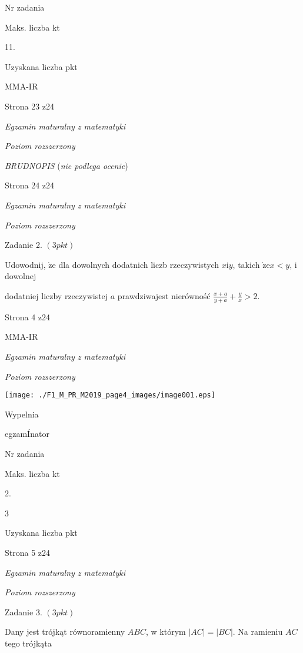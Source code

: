 \documentclass[a4paper,12pt]{article}
\begin{document}
Nr zadania

Maks. liczba kt

11.

Uzyskana liczba pkt

MMA-IR

Strona 23 z24





{\it Egzamin maturalny z matematyki}

{\it Poziom rozszerzony}

{\it BRUDNOPIS} ({\it nie podlega ocenie})

Strona 24 z24





{\it Egzamin maturalny z matematyki}

{\it Poziom rozszerzony}

Zadanie 2. $(3pkt)$

Udowodnij, $\dot{\mathrm{z}}\mathrm{e}$ dla dowolnych dodatnich liczb rzeczywistych $x\mathrm{i}y$, takich $\dot{\mathrm{z}}\mathrm{e}x<y$, i dowolnej

dodatniej liczby rzeczywistej $a$ prawdziwajest nierówność $\displaystyle \frac{x+a}{y+a}+\frac{y}{x}>2.$

Strona 4 z24

MMA-IR





{\it Egzamin maturalny z matematyki}

{\it Poziom rozszerzony}
\begin{center}
\texttt{[image: ./F1\_M\_PR\_M2019\_page4\_images/image001.eps]}
\end{center}
Wypelnia

egzamÍnator

Nr zadania

Maks. liczba kt

2.

3

Uzyskana liczba pkt

Strona 5 z24





{\it Egzamin maturalny z matematyki}

{\it Poziom rozszerzony}

Zadanie 3. $(3pkt)$

Dany jest trójkąt równoramienny $ABC$, w którym $|AC|=|BC|$. Na ramieniu $AC$ tego trójkąta
\end{document}
